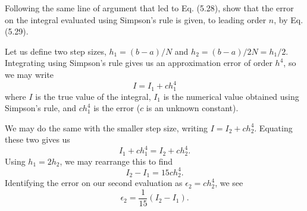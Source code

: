 \documentclass{exam}
\begin{document}
	\printanswers
	\begin{questions}
		\question Following the same line of argument that led to Eq. (5.28), show that the error on the integral evaluated using Simpson's rule is given, to leading order $n$, by Eq. (5.29).
		
		\begin{solution}
			Let us define two step sizes, $h_1 = (b-a)/N$ and $h_2 = (b-a)/2N = h_1/2$. Integrating using Simpson's rule gives us an approximation error of order $h^4$, so we may write
			\[
				I = I_1 + ch_1^4
			\]
			where $I$ is the true value of the integral, $I_1$ is the numerical value obtained using Simpson's rule, and $ch_1^4$ is the error ($c$ is an unknown constant).
			
			We may do the same with the smaller step size, writing $I = I_2 + ch_2^4$. Equating these two gives us
			\[
				I_1 + ch_1^4 = I_2 + ch_2^4.
			\]
			Using $h_1 = 2h_2$, we may rearrange this to find
			\[
				I_2 - I_1 = 15ch_2^4.
			\]
			Identifying the error on our second evaluation as $\epsilon_2 = ch_2^4$, we see
			\[
				\epsilon_2 = \frac{1}{15}(I_2-I_1).
			\]
		\end{solution}
	\end{questions}
\end{document}
